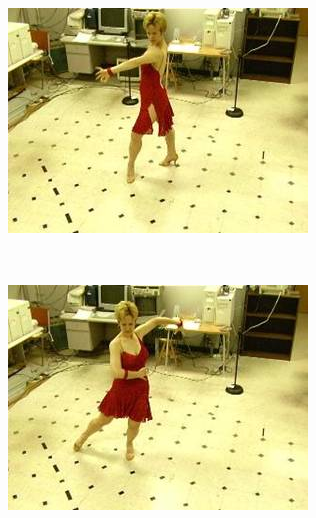 \begin{figure}

  \begin{subfigure}[b]{0.3\textwidth}
    \centering
    \includegraphics[width=\textwidth]{images/3d-input-left.png}
    \caption{}
  \end{subfigure}
  ~
  \begin{subfigure}[b]{0.3\textwidth}
    \centering
    \includegraphics[width=\textwidth]{images/3d-input-right.png}
    \caption{}
  \end{subfigure}
  ~
  \begin{subfigure}[b]{0.3\textwidth}
    \centering

\end{subfigure}
\end{figure}
